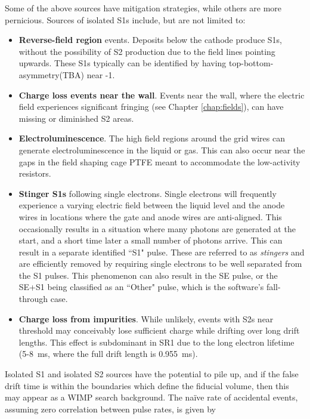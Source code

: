 Some of the above sources have mitigation strategies, while others are more pernicious.
Sources of isolated S1s include, but are not limited to:
\begin{itemize}
    \item \textbf{Reverse-field region} events.
    Deposits below the cathode produce S1s, without the possibility of S2 production due to the field lines pointing upwards. 
    These S1s typically can be identified by having top-bottom-asymmetry(TBA) near -1.
    \item \textbf{Charge loss events near the wall}.
    Events near the wall, where the electric field experiences significant fringing (see Chapter \ref{chap:fields}), can have missing or diminished S2 areas. 
    \item \textbf{Electroluminescence}. 
    The high field regions around the grid wires can generate electroluminescence in the liquid or gas\cite{aprile_measurements_2014,bodnia_electric_2021}. 
    This can also occur near the gaps in the field shaping cage PTFE meant to accommodate the low-activity resistors.
    \item \textbf{Stinger S1s} following single electrons.
    Single electrons will frequently experience a varying electric field between the liquid level and the anode wires in locations where the gate and anode wires are anti-aligned.
    This occasionally results in a situation where many photons are generated at the start, and a short time later a small number of photons arrive.
    This can result in a separate identified ``S1" pulse. These are referred to as \textit{stingers} and are efficiently removed by requiring single electrons to be well separated from the S1 pulses.
    This phenomenon can also result in the SE pulse, or the SE+S1 being classified as an ``Other" pulse, which is the software's fall-through case.
    \item \textbf{Charge loss from impurities}.
    While unlikely, events with S2s near threshold may conceivably lose sufficient charge while drifting over long drift lengths.
    This effect is subdominant in SR1 due to the long electron lifetime (5-8~ms, where the full drift length is 0.955~ms).
\end{itemize}

Isolated S1 and isolated S2 sources have the potential to pile up, and if the false drift time is within the boundaries which define the fiducial volume, then this may appear as a WIMP search background.
The na\"ive rate of accidental events, assuming zero correlation between pulse rates, is given by

